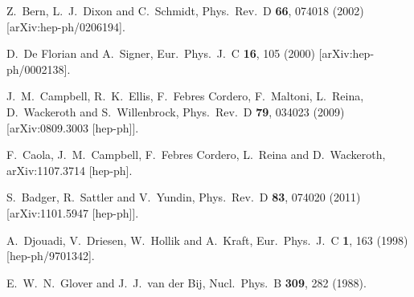 \documentclass[12pt]{article}
\begin{document}
\begin{thebibliography}{99}
  Z.~Bern, L.~J.~Dixon and C.~Schmidt,
  Phys.\ Rev.\  D {\bf 66}, 074018 (2002)
  [arXiv:hep-ph/0206194].

  D.~De Florian and A.~Signer,
  Eur.\ Phys.\ J.\  C {\bf 16}, 105 (2000)
  [arXiv:hep-ph/0002138].

  J.~M.~Campbell, R.~K.~Ellis, F.~Febres Cordero, F.~Maltoni, L.~Reina, D.~Wackeroth and S.~Willenbrock,
  Phys.\ Rev.\  D {\bf 79}, 034023 (2009)
  [arXiv:0809.3003 [hep-ph]].
  
  F.~Caola, J.~M.~Campbell, F.~Febres Cordero, L.~Reina and D.~Wackeroth,
  arXiv:1107.3714 [hep-ph].

  S.~Badger, R.~Sattler and V.~Yundin,
  Phys.\ Rev.\  D {\bf 83}, 074020 (2011)
  [arXiv:1101.5947 [hep-ph]].

  A.~Djouadi, V.~Driesen, W.~Hollik and A.~Kraft,
  Eur.\ Phys.\ J.\ C {\bf 1}, 163 (1998)
  [hep-ph/9701342].

  E.~W.~N.~Glover and J.~J.~van der Bij,
  Nucl.\ Phys.\ B {\bf 309}, 282 (1988).

\end{thebibliography}
\end{document}
